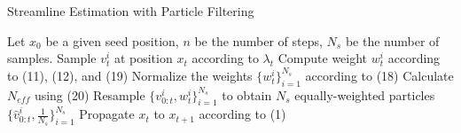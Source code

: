 \begin{algorithm}[h]
\caption{Streamline Estimation with Particle Filtering} \label{algo:pf}
\begin{algorithmic} [1]

\State Let $x_0$ be a given seed position, $n$ be the number of steps, $N_s$ be the number of samples.
\State Sample $v_t^i$ at position $x_t$ according to ${\lambda_t}$
\State Compute weight $w_t^i$ according to (11), (12), and (19)
\EndFor
\State Normalize the weights $\{w_t^i\}_{i=1}^{N_s}$ according to (18)
\State Calculate $N_{eff}$ using (20)
\State Resample $\{ v_{0:t}^i,w_t^i\} _{i = 1}^{{N_s}}$ to obtain $N_s$ equally-weighted particles $\{ \hat{v}_{0:t}^i,\frac{1}{N_s}\} _{i = 1}^{{N_s}}$
\EndIf
\State Propagate $x_t$ to $x_{t+1}$ according to (1)
\EndFor

\end{algorithmic}
\end{algorithm}

